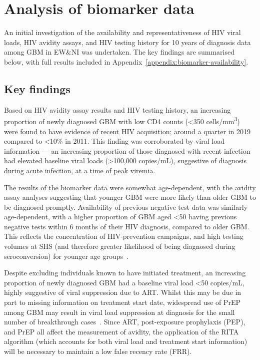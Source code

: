 \section{Analysis of biomarker data}

An initial investigation of the availability and representativeness of HIV viral loads, HIV avidity assays, and HIV testing history for 10 years of diagnosis data among GBM in EW\&NI was undertaken. The key findings are summarised below, with full results included in Appendix~\ref{appendix:biomarker-availability}.

\subsection{Key findings}

Based on HIV avidity assay results and HIV testing history, an increasing proportion of newly diagnosed GBM with low CD4 counts (<350 cells/mm\textsuperscript{3}) were found to have evidence of recent HIV acquisition; around a quarter in 2019 compared to <10\% in 2011. This finding was corroborated by viral load information --- an increasing proportion of those diagnosed with recent infection had elevated baseline viral loads (>100,000 copies/mL), suggestive of diagnosis during acute infection, at a time of peak viremia.

The results of the biomarker data were somewhat age-dependent, with the avidity assay analyses suggesting that younger GBM were more likely than older GBM to be diagnosed promptly. Availability of previous negative test data was similarly age-dependent, with a higher proportion of GBM aged <50 having previous negative tests within 6 months of their HIV diagnosis, compared to older GBM\@. This reflects the concentration of HIV-prevention campaigns, and high testing volumes at SHS (and therefore greater likelihood of being diagnosed during seroconversion) for younger age groups~\parencite{Whitlock2020-aa}.

Despite excluding individuals known to have initiated treatment, an increasing proportion of newly diagnosed GBM had a baseline viral load <50 copies/mL, highly suggestive of viral suppression due to ART\@. Whilst this may be due in part to missing information on treatment start date, widespread use of PrEP among GBM may result in viral load suppression at diagnosis for the small number of breakthrough cases~\parencite{Ambrosioni2021-es}. Since ART, post-exposure prophylaxis (PEP), and PrEP all affect the measurement of avidity, the application of the RITA algorithm (which accounts for both viral load and treatment start information) will be necessary to maintain a low false recency rate (FRR).

